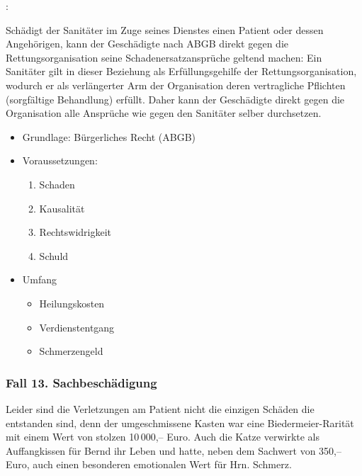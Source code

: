 {:

Schädigt der Sanitäter im Zuge seines Dienstes einen Patient
oder dessen Angehörigen, kann der Geschädigte nach
 ABGB direkt gegen die Rettungsorganisation
seine Schadenersatzansprüche geltend machen: Ein Sanitäter
gilt in dieser Beziehung als Erfüllungsgehilfe der
Rettungsorganisation, wodurch er als verlängerter Arm der
Organisation deren vertragliche Pflichten (sorgfältige
Behandlung) erfüllt. Daher kann der Geschädigte direkt gegen
die Organisation alle Ansprüche wie gegen den Sanitäter
selber durchsetzen.
}{
\begin{itemize}
  \item Grundlage: Bürgerliches Recht (ABGB)
  \item Voraussetzungen:
  \begin{enumerate}
    \item {Schaden}
    \item {Kausalität}
    \item {Rechtswidrigkeit}
    \item {Schuld}
\end{enumerate}
\item Umfang
\begin{itemize}
	\item Heilungskosten
	\item Verdienstentgang
	\item Schmerzengeld
\end{itemize}
\end{itemize}
}
{}{}{}



\subsubsection{Fall 13. Sachbeschädigung}
\label{topic:jus-langer-dienst-fall-13}


{Leider sind die Verletzungen am Patient nicht die einzigen
Schäden die entstanden sind, denn der umgeschmissene Kasten
war eine Biedermeier-Rarität mit einem Wert von stolzen
10\,000,-- Euro. Auch die Katze verwirkte als Auffangkissen
für Bernd ihr Leben und hatte, neben dem Sachwert von 350,--
Euro, auch einen besonderen emotionalen Wert für
Hrn. Schmerz.}{}{}{}{}



